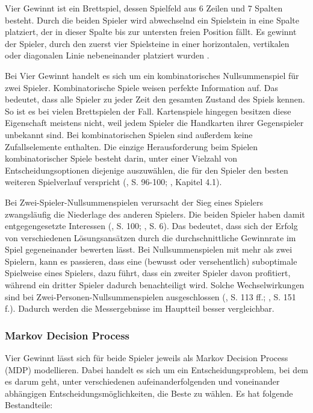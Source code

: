 \label{vier-gewinnt}

Vier Gewinnt ist ein Brettspiel, dessen Spielfeld aus 6 Zeilen und 7 Spalten besteht. Durch die beiden Spieler wird abwechselnd ein Spielstein in eine Spalte platziert, der in dieser Spalte bis zur untersten freien Position fällt. Es gewinnt der Spieler, durch den zuerst vier Spielsteine in einer horizontalen, vertikalen oder diagonalen Linie nebeneinander platziert wurden \cite{MiltonBradleyCompany.1990}.

Bei Vier Gewinnt handelt es sich um ein kombinatorisches Nullsummenspiel für zwei Spieler. Kombinatorische Spiele weisen \glqq perfekte Information\grqq{} auf. Das bedeutet, dass alle Spieler zu jeder Zeit den gesamten Zustand des Spiels kennen. So ist es bei vielen Brettspielen der Fall. Kartenspiele hingegen besitzen diese Eigenschaft meistens nicht, weil jedem Spieler die Handkarten ihrer Gegenspieler unbekannt sind. Bei kombinatorischen Spielen sind außerdem keine Zufallselemente enthalten. Die einzige Herausforderung beim Spielen kombinatorischer Spiele besteht darin, unter einer Vielzahl von Entscheidungsoptionen diejenige auszuwählen, die für den Spieler den besten weiteren Spielverlauf verspricht (\cite{Bewersdorff.2018}, S. 96-100; \cite{Ferguson.January2019}, Kapitel 4.1).

Bei Zwei-Spieler-Nullsummenspielen verursacht der Sieg eines Spielers zwangsläufig die Niederlage des anderen Spielers. Die beiden Spieler haben damit entgegengesetzte Interessen (\cite{Bewersdorff.2018}, S. 100; \cite{Allis.1994}, S. 6). Das bedeutet, dass sich der Erfolg von verschiedenen Lösungsansätzen durch die durchschnittliche Gewinnrate im Spiel gegeneinander bewerten lässt. Bei Nullsummenspielen mit mehr als zwei Spielern, kann es passieren, dass eine (bewusst oder versehentlich) suboptimale Spielweise eines Spielers, dazu führt, dass ein zweiter Spieler davon profitiert, während ein dritter Spieler dadurch benachteiligt wird. Solche Wechselwirkungen sind bei Zwei-Personen-Nullsummenspielen ausgeschlossen (\cite{Bewersdorff.2018}, S. 113 ff.; \cite{Russell.2020}, S. 151 f.). Dadurch werden die Messergebnisse im Hauptteil besser vergleichbar.

\subsubsection{Markov Decision Process}

Vier Gewinnt lässt sich für beide Spieler jeweils als Markov Decision Process (MDP) modellieren. Dabei handelt es sich um ein Entscheidungsproblem, bei dem es darum geht, unter verschiedenen aufeinanderfolgenden und voneinander abhängigen Entscheidungsmöglichkeiten, die Beste zu wählen. Es hat folgende Bestandteile:

